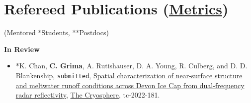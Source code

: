 \section*{Refereed Publications (\href{https://scholar.google.com/citations?user=kaUVku0AAAAJ&hl=fr}{Metrics})}

(Mentored *Students, **Postdocs)
\vspace{1em}

\textbf{In Review}
\begin{itemize}

\item
  *K. Chan, \textbf{C. Grima}, A. Rutishauser, D. A. Young, R. Culberg, and D. D. Blankenship, \texttt{submitted}, \href{https://tc.copernicus.org/preprints/tc-2022-181/}{Spatial characterization of near-surface structure and meltwater runoff conditions across Devon Ice Cap from dual-frequency radar reflectivity}, \ul{The Cryosphere}, tc-2022-181.

\end{itemize}

